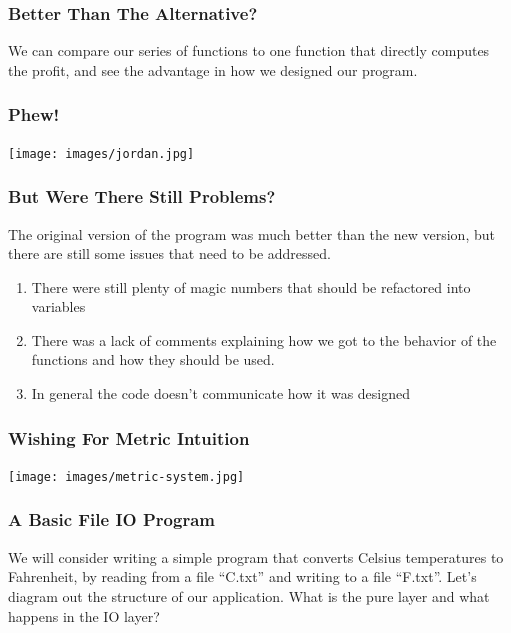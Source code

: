 \documentclass{beamer}
\begin{document}

\begin{frame}
  \frametitle{Better Than The Alternative?}
  We can compare our series of functions to one function that directly computes
  the profit, and see the advantage in how we designed our program.
  \pause
  \badProgram
\end{frame}

\begin{frame}
  \frametitle{Phew!}
  \begin{center}
    \texttt{[image: images/jordan.jpg]}
  \end{center}
\end{frame}

\begin{frame}
  \frametitle{But Were There Still Problems?}
  The original version of the program was much better than the new version, but
  there are still some issues that need to be addressed.
  \begin{enumerate}
  \item<2-> There were still plenty of magic numbers that should be refactored into variables
  \item<3-> There was a lack of comments explaining how we got to the behavior of
    the functions and how they should be used.
  \item<4-> In general the code doesn't communicate how it was designed
  \end{enumerate}
\end{frame}

\begin{frame}
  \frametitle{Wishing For Metric Intuition}
  \begin{center}
    \texttt{[image: images/metric-system.jpg]}
  \end{center}
\end{frame}

\begin{frame}
  \frametitle{A Basic File IO Program}
  We will consider writing a simple program that converts Celsius temperatures to Fahrenheit, by reading from a file ``C.txt''
  and writing to a file ``F.txt''. Let's diagram out the structure of our application. What is the pure layer and what happens
  in the IO layer?
\end{frame}
\end{document}
